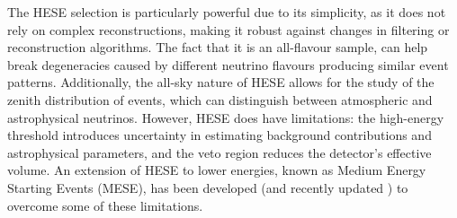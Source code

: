 The HESE selection is particularly powerful due to its simplicity, as it does not rely on complex reconstructions, making it robust against changes in filtering or reconstruction algorithms. The fact that it is an all-flavour sample, can help break degeneracies caused by different neutrino flavours producing similar event patterns. Additionally, the all-sky nature of HESE allows for the study of the zenith distribution of events, which can distinguish between atmospheric and astrophysical neutrinos. However, HESE does have limitations: the high-energy threshold introduces uncertainty in estimating background contributions and astrophysical parameters, and the veto region reduces the detector's effective volume. An extension of HESE to lower energies, known as Medium Energy Starting Events (MESE), has been developed  (and recently updated ) to overcome some of these limitations.

